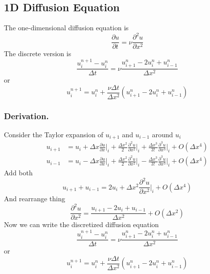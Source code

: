 \documentclass[../../../main.tex]{subfiles}
\begin{document}
\subsection{1D Diffusion Equation}
The one-dimensional diffusion equation is
\begin{equation*}
    \frac{\partial u}{\partial t}= \nu \frac{\partial^2 u}{\partial x^2}
\end{equation*}
The discrete version is 
\begin{equation*}
    \frac{u_{i}^{n+1}-u_{i}^{n}}{\Delta t}=\nu\frac{u_{i+1}^{n}-2u_{i}^{n}+u_{i-1}^{n}}{\Delta x^2}
\end{equation*}
or 
\begin{equation*}
    u_{i}^{n+1}=u_{i}^{n}+\frac{\nu\Delta t}{\Delta x^2}(u_{i+1}^{n}-2u_{i}^{n}+u_{i-1}^{n})
\end{equation*}

\subsubsection*{Derivation.}
Consider the Taylor expansion of $u_{i+1}$ and $u_{i-1}$ around $u_i$
\begin{align*}
    u_{i+1} &=  u_i + \Delta x \frac{\partial u}{\partial x}\bigg|_i + \frac{\Delta x^2}{2} \frac{\partial ^2 u}{\partial x^2}\bigg|_i + \frac{\Delta x^3}{3!} \frac{\partial ^3 u}{\partial x^3}\bigg|_i + O(\Delta x^4)\\
    u_{i-1} &=  u_i - \Delta x \frac{\partial u}{\partial x}\bigg|_i + \frac{\Delta x^2}{2} \frac{\partial ^2 u}{\partial x^2}\bigg|_i - \frac{\Delta x^3}{3!} \frac{\partial ^3 u}{\partial x^3}\bigg|_i + O(\Delta x^4)
\end{align*}
Add both 
\begin{equation*}
    u_{i+1} + u_{i-1} = 2u_i+\Delta x^2 \frac{\partial ^2 u}{\partial x^2}\bigg|_i + O(\Delta x^4)
\end{equation*}
And rearrange thing 
\begin{equation*}
    \frac{\partial ^2 u}{\partial x^2}=\frac{u_{i+1}-2u_{i}+u_{i-1}}{\Delta x^2} + O(\Delta x^2)
\end{equation*}
Now we can write the discretized diffusion equation
\begin{equation*}
    \frac{u_{i}^{n+1}-u_{i}^{n}}{\Delta t}=\nu\frac{u_{i+1}^{n}-2u_{i}^{n}+u_{i-1}^{n}}{\Delta x^2}
\end{equation*}
or 
\begin{equation*}
    u_{i}^{n+1}=u_{i}^{n}+\frac{\nu\Delta t}{\Delta x^2}(u_{i+1}^{n}-2u_{i}^{n}+u_{i-1}^{n})
\end{equation*}
\end{document}
